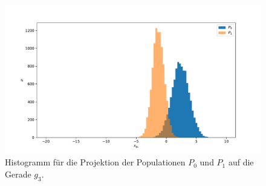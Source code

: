 \documentclass[a4paper, 11pt]{article}
\begin{document}
\begin{figure}
  \centering
  \includegraphics[width=\textwidth]{../A13/A13b_3}
  \caption{Histogramm für die Projektion der Populationen $P_0$ und $P_1$ auf
  die Gerade $g_3$.}
  \label{fig:hist3}
\end{figure}
\end{document}
